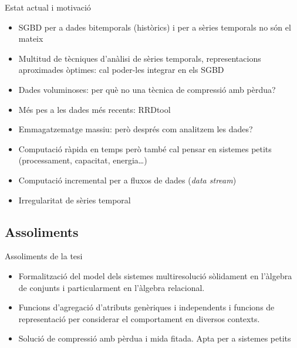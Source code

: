 
\begin{frame}{Estat actual i motivació}
  \begin{itemize}
  \item  SGBD per a dades bitemporals (històrics) i per a sèries temporals no són el mateix
  \item Multitud de tècniques d’anàlisi de sèries temporals, representacions aproximades òptimes: cal poder-les integrar en els SGBD %
  \item Dades voluminoses: per què no una tècnica de compressió amb pèrdua?
  \item Més pes a les dades més recents:  RRDtool%
  \item Emmagatzematge massiu:  però després com analitzem les dades?
  \item Computació ràpida en temps però també cal pensar en sistemes petits (processament, capacitat, energia\dots)
  \item Computació incremental per a fluxos de dades (\emph{data stream})
  \item Irregularitat de sèries temporal
  \end{itemize}

\end{frame}


\subsection{Assoliments}
\begin{frame}{Assoliments de la tesi}

  \begin{itemize}
  \item Formalització del model dels sistemes multiresolució sòlidament en l’àlgebra de conjunts i particularment en l’àlgebra relacional.
  \item Funcions d’agregació d’atributs genèriques i independents i funcions de representació per considerar el comportament en diversos contexts.
  \item Solució de compressió amb pèrdua i mida fitada. Apta per a sistemes petits
  \end{itemize}

\end{frame}





